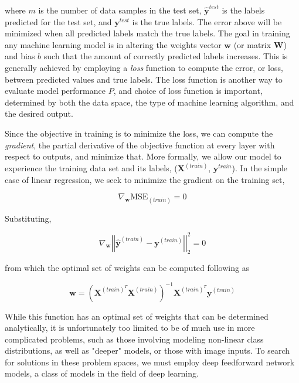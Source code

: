 where $m$ is the number of data samples in the test set, $\hat{\textbf{y}}^{test}$ is the labels predicted for the test set, and $\textbf{y}^{test}$ is the true labels.
The error above will be minimized when all predicted labels match the true labels.
The goal in training any machine learning model is in altering the weights vector $\textbf{w}$ (or matrix $\textbf{W}$) and bias $b$ such that the amount of correctly predicted labels increases.
This is generally achieved by employing a \textit{loss} function to compute the error, or loss, between predicted values and true labels.
The loss function is another way to evaluate model performance $P$, and choice of loss function is important, determined by both the data space, the type of machine learning algorithm, and the desired output.

Since the objective in training is to minimize the loss, we can compute the \textit{gradient}, the partial derivative of the objective function at every layer with respect to outputs, and minimize that. 
More formally, we allow our model to experience the training data set and its labels, ($\textbf{X}^{(train)}$, $\textbf{y}^{train}$). 
In the simple case of linear regression, we seek to minimize the gradient on the training set, 

\begin{equation}
\nabla_\textbf{w}\mathrm{MSE}_{(train)} = 0
\end{equation}

Substituting,

\begin{equation}
\nabla_\textbf{w} \left| \left| \hat{\textbf{y}}^{(train)} - \textbf{y}^{(train)} \right| \right|_2^2 = 0
\end{equation}

from which the optimal set of weights can be computed following \cite{goodfellow2016} as

\begin{equation}
\textbf{w} = \left( \textbf{X}^{(train)^T} \textbf{X}^{(train)} \right)^{-1} \textbf{X}^{(train)^T} \textbf{y}^{(train)}
\end{equation}

While this function has an optimal set of weights that can be determined analytically, it is unfortunately too limited to be of much use in more complicated problems, such as those involving modeling non-linear class distributions, as well as "deeper" models, or those with image inputs. 
To search for solutions in these problem spaces, we must employ deep feedforward network models, a class of models in the field of deep learning.

